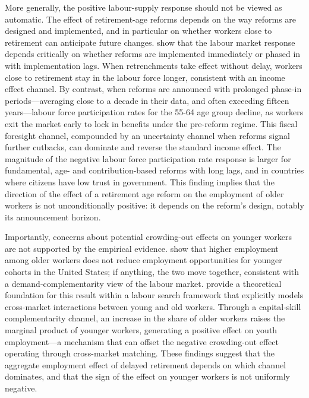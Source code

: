 \documentclass[11pt,english,a4paper, twoside, authoryear]{article}
\begin{document}
More generally, the positive labour-supply response should not be viewed as automatic. The effect of retirement-age reforms depends on the way reforms are designed and implemented, and in particular on whether workers close to retirement can anticipate future changes. \citet{BiZubairy2023} show that the labour market response depends critically on whether reforms are implemented immediately or phased in with implementation lags. When retrenchments take effect without delay, workers close to retirement stay in the labour force longer, consistent with an income effect channel. By contrast, when reforms are announced with prolonged phase-in periods---averaging close to a decade in their data, and often exceeding fifteen years---labour force participation rates for the 55-64 age group decline, as workers exit the market early to lock in benefits under the pre-reform regime. This fiscal foresight channel, compounded by an uncertainty channel when reforms signal further cutbacks, can dominate and reverse the standard income effect. The magnitude of the negative labour force participation rate response is larger for fundamental, age- and contribution-based reforms with long lags, and in countries where citizens have low trust in government. This finding implies that the direction of the effect of a retirement age reform on the employment of older workers is not unconditionally positive: it depends on the reform's design, notably its announcement horizon.

Importantly, concerns about potential crowding-out effects on younger workers are not supported by the empirical evidence. \citet{MunnellWu2012} show that higher employment among older workers does not reduce employment opportunities for younger cohorts in the United States; if anything, the two move together, consistent with a demand-complementarity view of the labour market. \citet{Dai2022} provide a theoretical foundation for this result within a labour search framework that explicitly models cross-market interactions between young and old workers. Through a capital-skill complementarity channel, an increase in the share of older workers raises the marginal product of younger workers, generating a positive effect on youth employment---a mechanism that can offset the negative crowding-out effect operating through cross-market matching. These findings suggest that the aggregate employment effect of delayed retirement depends on which channel dominates, and that the sign of the effect on younger workers is not uniformly negative.
\end{document}
